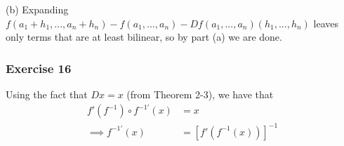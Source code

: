 (b) Expanding $f(a_1 + h_1, ..., a_n + h_n) - f(a_1, ..., a_n) - Df(a_1, ..., a_n)(h_1, ..., h_n)$
leaves only terms that are at least bilinear, so by part (a) we are done.

\subsubsection{Exercise 16}
Using the fact that $Dx = x$ (from Theorem 2-3), we have that
\begin{align*}
        f'(f^{-1}) \circ f^{-1\prime} (x) &= x \\
        \implies f^{-1\prime} (x) &= [f'(f^{-1} (x))]^{-1} 
\end{align*}
